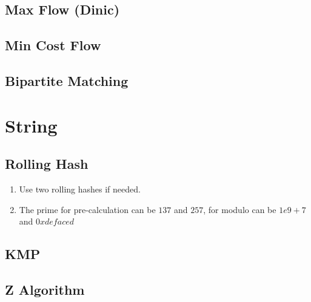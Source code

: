 \documentclass[10pt,oneside]{article}
\begin{document}
\begin{landscape}
\begin{multicols}{2}
\subsection{Max Flow (Dinic)}


\subsection{Min Cost Flow}


\subsection{Bipartite Matching}



\section{String}

\subsection{Rolling Hash}

\begin{enumerate}
	\item Use two rolling hashes if needed.  
	\item The prime for pre-calculation can be $137$ and $257$, for modulo can be $1e9 + 7$ and $0xdefaced$ 
\end{enumerate}



\subsection{KMP}



\subsection{Z Algorithm}




\end{multicols}
\end{landscape}
\end{document}
